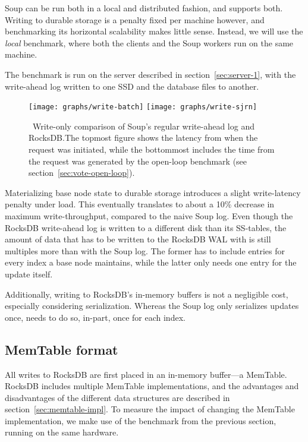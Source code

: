 Soup can be run both in a local and distributed fashion, and 
supports both. Writing to durable storage is a penalty fixed per machine
however, and benchmarking its horizontal scalability makes little sense.
Instead, we will use the \textit{local}  benchmark, where both the
clients and the Soup workers run on the same machine.

The benchmark is run on the server described in section~\ref{sec:server-1}, with
the write-ahead log written to one SSD and the database files to another.

\begin{figure}[H]
  \texttt{[image: graphs/write-batch]}
  \texttt{[image: graphs/write-sjrn]}
  \caption{\
    Write-only comparison of Soup's regular write-ahead log and RocksDB.\@ The
    topmost figure shows the latency from when the request was initiated, while
    the bottommost includes the time from the request was generated by the
    open-loop benchmark (see section~\ref{sec:vote-open-loop}).
  }\label{fig:graph-write}
\end{figure}

Materializing base node state to durable storage introduces a slight
write-latency penalty under load. This eventually translates to about a 10\%
decrease in maximum write-throughput, compared to the naive Soup log. Even
though the RocksDB write-ahead log is written to a different disk than its
SS-tables, the amount of data that has to be written to the RocksDB WAL with
\code{PersistentState} is still multiples more than with the Soup log. The
former has to include entries for every index a base node maintains, while the
latter only needs one entry for the update itself.

Additionally, writing to RocksDB's in-memory buffers is not a negligible cost,
especially considering serialization. Whereas the Soup log only serializes
updates once, \code{PersistentState} needs to do so, in-part, once for each
index.

\subsection{MemTable format}

All writes to RocksDB are first placed in an in-memory buffer---a MemTable.
RocksDB includes multiple MemTable implementations, and the advantages and
disadvantages of the different data structures are described in
section~\ref{sec:memtable-impl}. To measure the impact of changing the MemTable
implementation, we make use of the \code{vote} benchmark from the previous
section, running on the same hardware.

